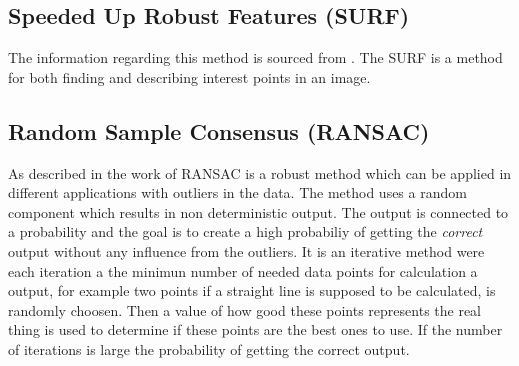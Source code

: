 \subsection{Speeded Up Robust Features (SURF)}
The information regarding this method is sourced from \cite{SURF}. The SURF is a method for both finding and describing interest points in an image.

\subsection{Random Sample Consensus (RANSAC)}
As described in the work of \cite{RANSAC} RANSAC is a robust method which can be applied in different applications with outliers in the data. The method uses a random component which results in non deterministic output. The output is connected to a probability and the goal is to create a high probabiliy of getting the {\it correct} output without any influence from the outliers. It is an iterative method were each iteration a the minimun number of needed data points for calculation a output, for example two points if a straight line is supposed to be calculated, is randomly choosen. Then a value of how good these points represents the real thing is used to determine if these points are the best ones to use. If the number of iterations is large the probability of getting the correct output.
